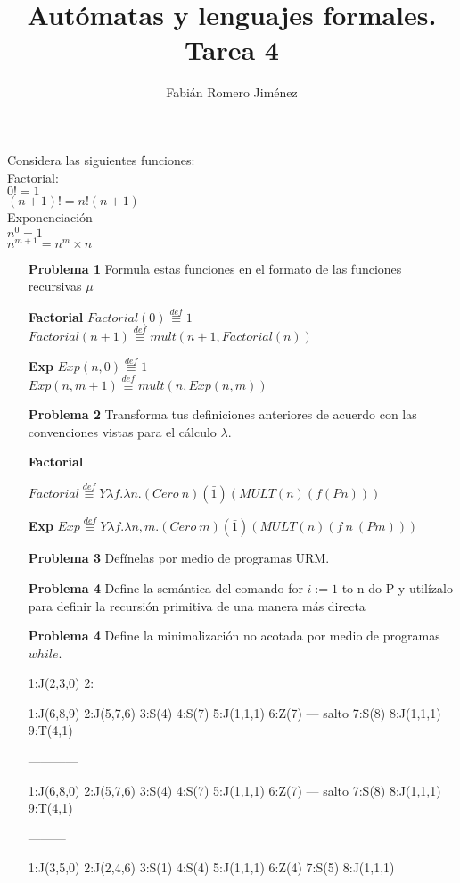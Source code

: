 \documentclass{article}
\title{Autómatas y lenguajes formales. Tarea 4}
\author{Fabián Romero Jiménez}
\begin{document}
\maketitle
Considera las siguientes funciones:\\
Factorial: \\
$0! = 1$ \\
$(n + 1)! = n!  (n + 1)$ \\
Exponenciación \\
$n^0=1$ \\
$n^{m+1}=n^m \times n$ \\

\begin{enumerate}
\item[\bf{Problema 1}] Formula estas funciones en el formato de las  
funciones recursivas $\mu$ 

\item[\bf{Factorial}]
$Factorial(0)  \stackrel{def}{\equiv} 1$\\
$Factorial(n+1) \stackrel{def}{\equiv} mult(n+1,Factorial(n))$

\item[\bf{Exp}]
$Exp(n,0)  \stackrel{def}{\equiv} 1$\\
$Exp(n,m+1) \stackrel{def}{\equiv} mult(n,Exp(n,m))$

\item[\bf{Problema 2}] Transforma tus definiciones anteriores de acuerdo con las convenciones vistas para el cálculo $\lambda$.

\item[\bf{Factorial}]

$Factorial \stackrel{def}{\equiv}  Y \lambda f . \lambda n.(Cero \: n)(\bar 1)(MULT(n)(f(P n))) $\\

\item[\bf{Exp}]$Exp \stackrel{def}{\equiv}  Y \lambda f . \lambda n,m.(Cero \: m)(\bar 1) (MULT(n)(f\:n\:(P m) )) $\\

\item[\bf{Problema 3}] Defínelas por medio de programas URM.

\item[\bf{Problema 4}]Define la semántica del comando
for $i := 1$ to n do P
y utilízalo para definir la recursión primitiva de una manera más directa

\item[\bf{Problema 4}] Define la minimalización no acotada por medio de programas $while$.


1:J(2,3,0)
2:


1:J(6,8,9)
2:J(5,7,6)
3:S(4)
4:S(7)
5:J(1,1,1)
6:Z(7) --- salto
7:S(8)
8:J(1,1,1)
9:T(4,1)

------------

1:J(6,8,0)
2:J(5,7,6)
3:S(4)
4:S(7)
5:J(1,1,1)
6:Z(7) --- salto
7:S(8)
8:J(1,1,1)
9:T(4,1)


---------
      
1:J(3,5,0)
2:J(2,4,6)
3:S(1)
4:S(4)
5:J(1,1,1)
6:Z(4)
7:S(5)
8:J(1,1,1)


\end{enumerate}
\end{document}
